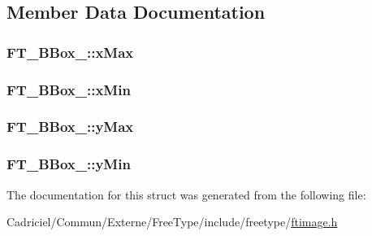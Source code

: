 \subsection{Member Data Documentation}
\hypertarget{struct_f_t___b_box___ac6da5c44f4cb7b97eef1f438eb69c0ec}{
\subsubsection[{x\-Max}]{ F\-T\-\_\-\-B\-Box\-\_\-\-::x\-Max}}\label{struct_f_t___b_box___ac6da5c44f4cb7b97eef1f438eb69c0ec}
\hypertarget{struct_f_t___b_box___a1f2a5d0565d496c1d41e43d018f45add}{
\subsubsection[{x\-Min}]{ F\-T\-\_\-\-B\-Box\-\_\-\-::x\-Min}}\label{struct_f_t___b_box___a1f2a5d0565d496c1d41e43d018f45add}
\hypertarget{struct_f_t___b_box___a77084921589f386a8a593ae1f25b1569}{
\subsubsection[{y\-Max}]{ F\-T\-\_\-\-B\-Box\-\_\-\-::y\-Max}}\label{struct_f_t___b_box___a77084921589f386a8a593ae1f25b1569}
\hypertarget{struct_f_t___b_box___a959ca1d5bc1c5338da0d85c8e7135f4e}{
\subsubsection[{y\-Min}]{ F\-T\-\_\-\-B\-Box\-\_\-\-::y\-Min}}\label{struct_f_t___b_box___a959ca1d5bc1c5338da0d85c8e7135f4e}


The documentation for this struct was generated from the following file\-:\begin{DoxyCompactItemize}
\item 
Cadriciel/\-Commun/\-Externe/\-Free\-Type/include/freetype/\hyperlink{ftimage_8h}{ftimage.\-h}\end{DoxyCompactItemize}

